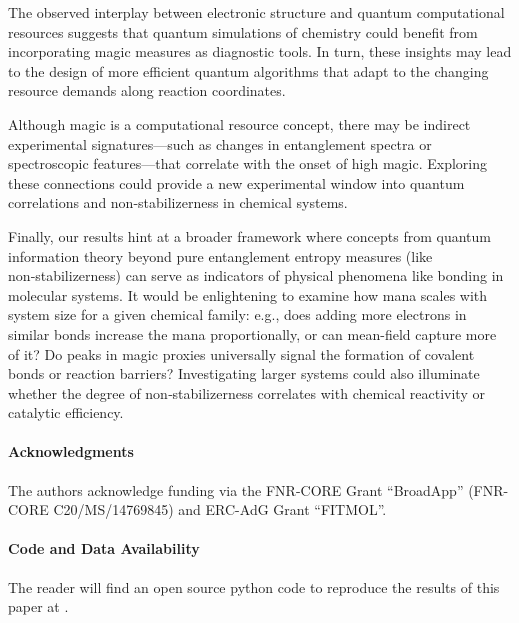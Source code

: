 \documentclass[aps, prl, twocolumn, groupedaddress, reprint, floatfix, nofootinbib, longbibliography]{revtex4-2}
\newcommand{\github}[1]{\href{#1}{\faGithubSquare}}
\newcommand{\esrgithub}{\github{https://github.com/MatthieuSarkis/magic_molecules}}
\begin{document}
    The observed interplay between electronic structure and quantum computational resources suggests that quantum simulations of chemistry could benefit from incorporating magic measures as diagnostic tools. In turn, these insights may lead to the design of more efficient quantum algorithms that adapt to the changing resource demands along reaction coordinates.

    Although magic is a computational resource concept, there may be indirect experimental signatures—such as changes in entanglement spectra or spectroscopic features—that correlate with the onset of high magic. Exploring these connections could provide a new experimental window into quantum correlations and non-stabilizerness in chemical systems.

    Finally, our results hint at a broader framework where concepts from quantum information theory beyond pure entanglement entropy measures (like non‑stabilizerness) can serve as indicators of physical phenomena like bonding in molecular systems. It would be enlightening to examine how mana scales with system size for a given chemical family: e.g., does adding more electrons in similar bonds increase the mana proportionally, or can mean-field capture more of it? Do peaks in magic proxies universally signal the formation of covalent bonds or reaction barriers? Investigating larger systems could also illuminate whether the degree of non‑stabilizerness correlates with chemical reactivity or catalytic efficiency.

\vspace{1em}
\paragraph*{Acknowledgments}

    The authors acknowledge funding via the FNR-CORE Grant ``BroadApp'' (FNR-CORE C20/MS/14769845) and ERC-AdG Grant ``FITMOL''.

\vspace{1em}
\paragraph*{Code and Data Availability}

    The reader will find an open source python code to reproduce the results of this paper at \esrgithub.

%
\nocite{*}

\end{document}
